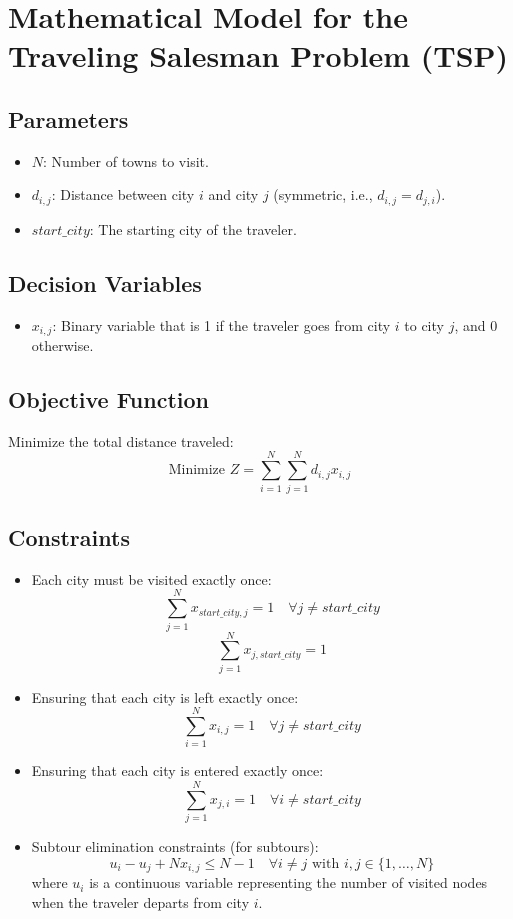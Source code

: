 \documentclass{article}
\begin{document}
\section*{Mathematical Model for the Traveling Salesman Problem (TSP)}

\subsection*{Parameters}
\begin{itemize}
    \item $N$: Number of towns to visit.
    \item $d_{i,j}$: Distance between city $i$ and city $j$ (symmetric, i.e., $d_{i,j} = d_{j,i}$).
    \item $start\_city$: The starting city of the traveler.
\end{itemize}

\subsection*{Decision Variables}
\begin{itemize}
    \item $x_{i,j}$: Binary variable that is 1 if the traveler goes from city $i$ to city $j$, and 0 otherwise.
\end{itemize}

\subsection*{Objective Function}
Minimize the total distance traveled:
\[
\text{Minimize } Z = \sum_{i=1}^{N} \sum_{j=1}^{N} d_{i,j} x_{i,j}
\]

\subsection*{Constraints}
\begin{itemize}
    \item Each city must be visited exactly once:
    \[
    \sum_{j=1}^{N} x_{start\_city,j} = 1 \quad \forall j \neq start\_city
    \]
    \[
    \sum_{j=1}^{N} x_{j,start\_city} = 1
    \]
    
    \item Ensuring that each city is left exactly once:
    \[
    \sum_{i=1}^{N} x_{i,j} = 1 \quad \forall j \neq start\_city
    \]
    
    \item Ensuring that each city is entered exactly once:
    \[
    \sum_{j=1}^{N} x_{j,i} = 1 \quad \forall i \neq start\_city
    \]

    \item Subtour elimination constraints (for subtours):
    \[
    u_i - u_j + N x_{i,j} \leq N - 1 \quad \forall i \neq j \text{ with } i,j \in \{1, \ldots, N\}
    \]
    where $u_i$ is a continuous variable representing the number of visited nodes when the traveler departs from city $i$.
\end{itemize}
\end{document}
